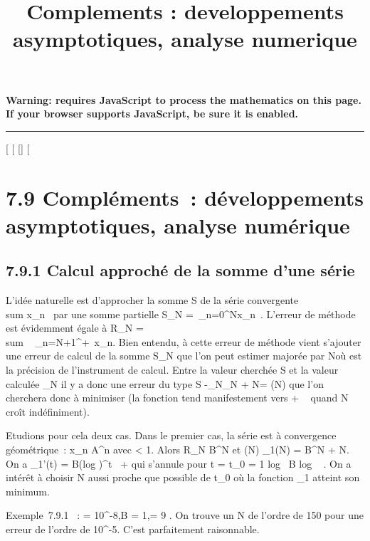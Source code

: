 \documentclass[]{article}
\title{Complements : developpements asymptotiques, analyse numerique}
\author{}
\date{}
\begin{document}
\maketitle

\textbf{Warning: 
requires JavaScript to process the mathematics on this page.\\ If your
browser supports JavaScript, be sure it is enabled.}

\begin{center}\rule{3in}{0.4pt}\end{center}

[
[
[]
[

\section{7.9 Compléments~: développements asymptotiques, analyse
numérique}

\subsection{7.9.1 Calcul approché de la somme d'une série}

L'idée naturelle est d'approcher la somme S de la série convergente
\\sum  x_n~ par
une somme partielle S_N =\
\sum  _n=0^Nx_n~.
L'erreur de méthode est évidemment égale à R_N
= \\sum ~
_n=N+1^+\infty~x_n. Bien entendu, à cette erreur de
méthode vient s'ajouter une erreur de calcul de la somme S_N
que l'on peut estimer majorée par N\epsilon où \epsilon est la précision de
l'instrument de calcul. Entre la valeur cherchée S et la valeur calculée
\overlineS_N il y a donc une erreur du type
S
-\overlineS_N\leqR_N
+ N\epsilon = \delta(N) que l'on cherchera donc à minimiser (la fonction \delta tend
manifestement vers + \infty~ quand N croît indéfiniment).

Etudions pour cela deux cas. Dans le premier cas, la série est à
convergence géométrique~: x_n\leq
A\rho^n avec \rho < 1. Alors R_N \leq
B\rho^N et \delta(N) \leq \delta_1(N) = B\rho^N + N\epsilon. On a
\delta_1'(t) = B(log \rho)\rho^t~ + \epsilon
qui s'annule pour t = t_0 = 1 \over \rho
 log~ \left  \epsilon
\over B log \rho~
\right . On a intérêt à choisir N aussi proche
que possible de t_0 où la fonction \delta_1 atteint son
minimum.

Exemple~7.9.1 ~: \epsilon = 10^-8,B = 1,\rho = 9  . On trouve un N de l'ordre de 150 pour une erreur de l'ordre de
10^-5. C'est parfaitement raisonnable.
\end{document}
